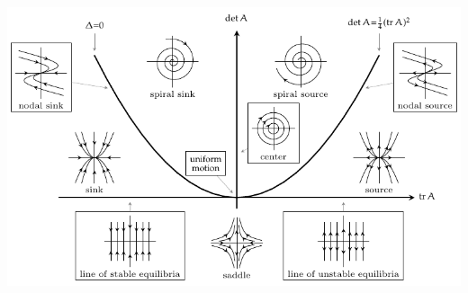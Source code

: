 \documentclass[10pt]{mypackage}
\begin{document}
\begin{center}
  \includegraphics[width=15cm]{images/trace_determinant.pdf}
\end{center}
\end{document}

